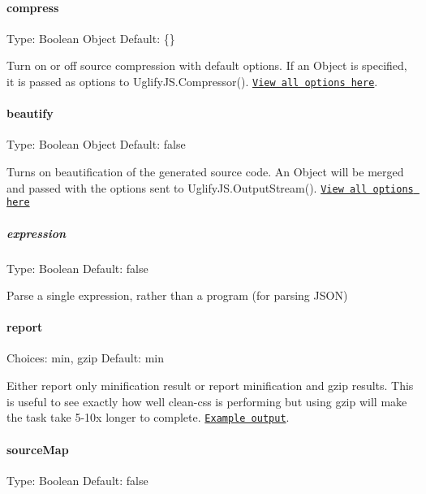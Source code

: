 \paragraph*{compress}

Type\+: {\ttfamily Boolean} {\ttfamily Object} Default\+: {\ttfamily \{\}}

Turn on or off source compression with default options. If an {\ttfamily Object} is specified, it is passed as options to {\ttfamily Uglify\+J\+S.\+Compressor()}. \href{https://github.com/mishoo/UglifyJS2#compressor-options}{\tt View all options here}.

\paragraph*{beautify}

Type\+: {\ttfamily Boolean} {\ttfamily Object} Default\+: {\ttfamily false}

Turns on beautification of the generated source code. An {\ttfamily Object} will be merged and passed with the options sent to {\ttfamily Uglify\+J\+S.\+Output\+Stream()}. \href{https://github.com/mishoo/UglifyJS2#beautifier-options}{\tt View all options here}

\subparagraph*{expression}

Type\+: {\ttfamily Boolean} Default\+: {\ttfamily false}

Parse a single expression, rather than a program (for parsing J\+S\+ON)

\paragraph*{report}

Choices\+: {\ttfamily \textquotesingle{}min\textquotesingle{}}, {\ttfamily \textquotesingle{}gzip\textquotesingle{}} Default\+: {\ttfamily \textquotesingle{}min\textquotesingle{}}

Either report only minification result or report minification and gzip results. This is useful to see exactly how well clean-\/css is performing but using {\ttfamily \textquotesingle{}gzip\textquotesingle{}} will make the task take 5-\/10x longer to complete. \href{https://github.com/sindresorhus/maxmin#readme}{\tt Example output}.

\paragraph*{source\+Map}

Type\+: {\ttfamily Boolean} Default\+: {\ttfamily false}

